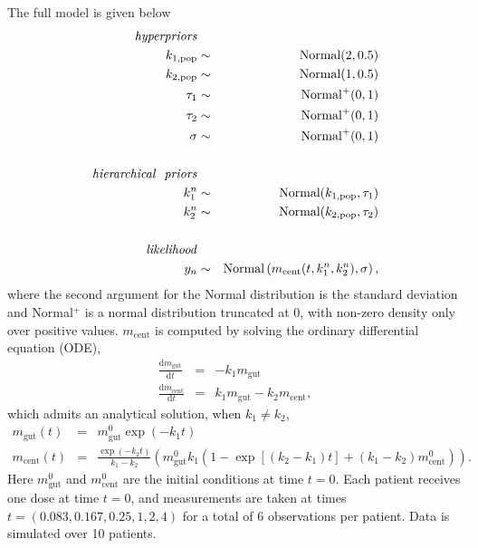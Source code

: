 \documentclass[stslayout, noinfoline]{imsart}
\theoremstyle{definition}
\begin{document}
The full model is given below
\begin{eqnarray*}
  \text{\textit{hyperpriors}} \\
  k_{1, \text{pop}} & \sim & \text{Normal}(2, 0.5) \\
  k_{2, \text{pop}} & \sim & \text{Normal}(1, 0.5) \\
  \tau_1 & \sim & \text{Normal}^+(0, 1) \\
  \tau_2 & \sim & \text{Normal}^+(0, 1) \\
  \sigma & \sim & \text{Normal}^+(0, 1) \\
  \\
  \text{\textit{hierarchical \ priors}} \\
  k_1^n & \sim & \text{Normal}(k_{1, \text{pop}}, \tau_1) \\
  k_2^n & \sim & \text{Normal}(k_{2, \text{pop}}, \tau_2) \\
  \\
  \text{\textit{likelihood}} \\
  y_n & \sim & \text{Normal} \left (m_\text{cent} (t, k_1^n, k_2^n), \sigma \right),
\end{eqnarray*}
%
where the second argument for the Normal distribution is the standard deviation
and Normal$^+$ is a normal distribution truncated at 0, 
with non-zero density only over positive values.
$m_\text{cent}$ is computed by solving the ordinary differential equation (ODE),
\begin{eqnarray*}
  \frac{\mathrm d m_\text{gut}}{\mathrm d t} & = & - k_1 m_\text{gut} \nonumber  \\
  \frac{\mathrm d m_\text{cent}}{\mathrm d t} & = & k_1 m_\text{gut} - k_2 m_\text{cent},
\end{eqnarray*}
which admits an analytical solution, when $k_1 \neq k_2$,
\begin{eqnarray*}
  m_\text{gut} (t) & = & m^0_\text{gut} \exp(- k_1 t) \nonumber \\
  m_\text{cent} (t) & = & \frac{\exp(- k_2 t)}{k_1 - k_2} \left (m^0_\text{gut} k_1 (1 - \exp[(k_2 - k_1) t] + (k_1 - k_2) m^0_\text{cent}) \right).
\end{eqnarray*}
%
Here $m^0_\text{gut}$ and $m^0_\text{cent}$ are the initial conditions at time $t = 0$.
Each patient receives one dose at time $t = 0$, 
and measurements are taken at times $t = (0.083, 0.167, 0.25, 1, 2, 4)$ for a total of 6 observations per patient.
Data is simulated over 10 patients. 
\end{document}
